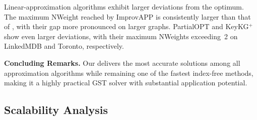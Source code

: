 Linear-approximation algorithms exhibit larger deviations from the optimum.
The maximum NWeight reached by ImprovAPP is consistently larger than that of \ImprovPTS, with their gap more pronounced on larger graphs. %
PartialOPT and KeyKG$^+$ show even larger deviations, with their maximum NWeights exceeding~2 on LinkedMDB and Toronto, respectively.


\textbf{Concluding Remarks.}
Our \ImprovPTS delivers the most accurate solutions among all approximation algorithms while remaining one of the fastest index-free methods, making it a highly practical GST solver with substantial application potential.

\subsection{Scalability Analysis}
\label{subsec: scalability}


